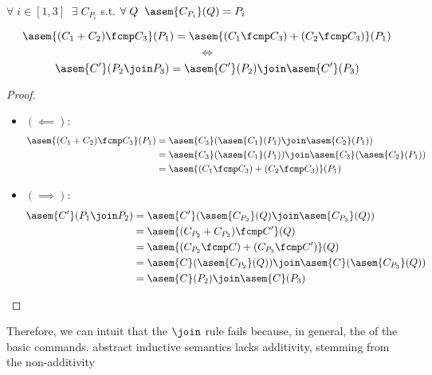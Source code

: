\begin{theorem} $\;$\\
  $\forall \; i \in [1, 3] \;\; \exists \; C_{P_i}$ s.t. 
  $\forall \; Q \;\; \asem{C_{P_i}}(Q) = P_i$

  $$\asem{(C_1 + C_2) \fcmp C_3}(P_1) = \asem{(C_1 \fcmp C_3) + (C_2 \fcmp C_3)}(P_1)$$
  $$\iff$$
  $$\asem{C'}(P_2 \join P_3) = \asem{C'}(P_2) \join \asem{C'}(P_3)$$
\end{theorem}
\begin{proof} $\;$\\
  \begin{itemize}
    \item $(\impliedby)$:
      \begin{align*}
        \asem{(C_1 + C_2) \fcmp C_3}(P_1)
          &= \asem{C_3}(\asem{C_1}(P_1) \join \asem{C_2}(P_1)) \\
          &= \asem{C_3}(\asem{C_1}(P_1)) \join \asem{C_3}(\asem{C_2}(P_1)) \\
          &= \asem{(C_1 \fcmp C_3) + (C_2 \fcmp C_3)}(P_1)
      \end{align*}
    \item $(\implies)$:
      \begin{align*}
        \asem{C'}(P_1 \join P_2) 
          &= \asem{C'}(\asem{C_{P_2}}(Q) \join \asem{C_{P_3}}(Q)) \\
          &= \asem{(C_{P_2} + C_{P_3}) \fcmp C'}(Q) \\
          &= \asem{(C_{P_2} \fcmp C) + (C_{P_3} \fcmp C')}(Q) \\
          &= \asem{C}(\asem{C_{P_2}}(Q)) \join \asem{C}(\asem{C_{P_3}}(Q)) \\
          &= \asem{C}(P_2) \join \asem{C}(P_3)
      \end{align*}
  \end{itemize}
\end{proof}

Therefore, we can intuit that the $\join$ rule fails because, in general, the
of the basic commands.
abstract inductive semantics lacks additivity, stemming from the non-additivity

